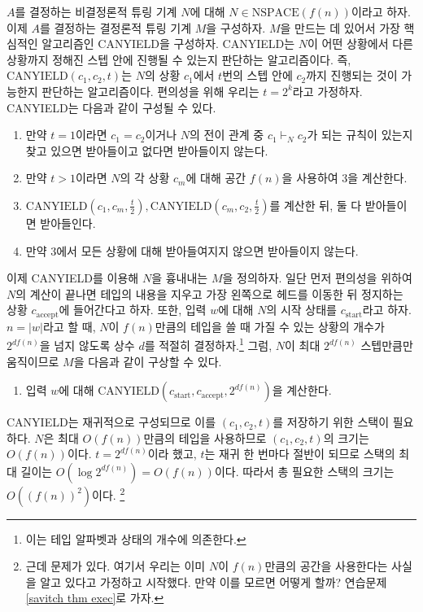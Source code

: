 \documentclass[a4paper, 11pt]{article}
\theoremstyle{definition}
\newenvironment{pf*}{\pushQED{\qed}\pf}
{\popQED\endpf}
\begin{document}
\begin{pf*}
    $A$를 결정하는 비결정론적 튜링 기계 $N$에 대해 $N \in \text{NSPACE}(f(n))$이라고 하자. 이제 $A$를 결정하는 결정론적 튜링 기계 $M$을 구성하자. $M$을 만드는 데 있어서 가장 핵심적인 알고리즘인 CANYIELD을 구성하자. CANYIELD는 $N$이 어떤 상황에서 다른 상황까지 정해진 스텝 안에 진행될 수 있는지 판단하는 알고리즘이다. 즉, $\text{CANYIELD}(c_1, c_2, t)$는 $N$의 상황 $c_1$에서 $t$번의 스텝 안에 $c_2$까지 진행되는 것이 가능한지 판단하는 알고리즘이다. 편의성을 위해 우리는 $t = 2^k$라고 가정하자. CANYIELD는 다음과 같이 구성될 수 있다.
    \begin{enumerate}
        \item 만약 $t = 1$이라면 $c_1 = c_2$이거나 $N$의 전이 관계 중
        $c_1 \vdash_N c_2$가 되는 규칙이 있는지 찾고 있으면 받아들이고 없다면 받아들이지 않는다.
        \item 만약 $t > 1$이라면 $N$의 각 상황 $c_m$에 대해 공간 $f(n)$을 사용하여 3을 계산한다.
        \item $\text{CANYIELD}(c_1, c_m, \frac{t}{2}), \text{CANYIELD}(c_m, c_2, \frac{t}{2})$를 계산한 뒤, 둘 다 받아들이면 받아들인다.
        \item 만약 3에서 모든 상황에 대해 받아들여지지 않으면 받아들이지 않는다.
    \end{enumerate}
    이제 CANYIELD를 이용해 $N$을 흉내내는 $M$을 정의하자. 일단 먼저 편의성을 위하여 $N$의 계산이 끝나면 테입의 내용을 지우고 가장 왼쪽으로 헤드를 이동한 뒤 정지하는 상황 $c_\text{accept}$에 들어간다고 하자. 또한, 입력 $w$에 대해 $N$의 시작 상태를 $c_\text{start}$라고 하자. $n = \vert w \vert$라고 할 때, $N$이 $f(n)$만큼의 테입을 쓸 때 가질 수 있는 상황의 개수가 $2^{df(n)}$을 넘지 않도록 상수 $d$를 적절히 결정하자.\footnote{이는 테입 알파벳과 상태의 개수에 의존한다.} 그럼, $N$이 최대 $2^{df(n)}$ 스텝만큼만 움직이므로 $M$을 다음과 같이 구상할 수 있다.
    \begin{enumerate}
        \item 입력 $w$에 대해 $\text{CANYIELD}(c_{\text{start}}, c_{\text{accept}}, 2^{df(n)})$을 계산한다.
    \end{enumerate}
    CANYIELD는 재귀적으로 구성되므로 이를 $(c_1, c_2, t)$를 저장하기 위한 스택이 필요하다. $N$은 최대 $O(f(n))$만큼의 테입을 사용하므로 $(c_1, c_2, t)$의 크기는 $O(f(n))$이다.  $t=2^{df(n)}$이라 했고, $t$는 재귀 한 번마다 절반이 되므로 스택의 최대 길이는 $O(\log{2^{df(n)}}) = O(f(n))$이다. 따라서 총 필요한 스택의 크기는 $O((f(n))^2)$이다. \footnote{근데 문제가 있다. 여기서 우리는 이미 $N$이 $f(n)$만큼의 공간을 사용한다는 사실을 알고 있다고 가정하고 시작했다. 만약 이를 모르면 어떻게 할까? 연습문제 \ref{savitch thm exec}로 가자.}
\end{pf*}
\end{document}
